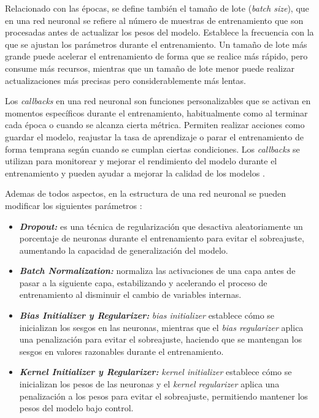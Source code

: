 Relacionado con las épocas, se define también el tamaño de lote (\textit{batch size}), que en una red neuronal se refiere al número de muestras de entrenamiento que son procesadas antes de actualizar los pesos del modelo. Establece la frecuencia con la que se ajustan los parámetros durante el entrenamiento. Un tamaño de lote más grande puede acelerar el entrenamiento de forma que se realice más rápido, pero consume más recursos, mientras que un tamaño de lote menor puede realizar actualizaciones más precisas pero considerablemente más lentas.

Los \textit{callbacks} en una red neuronal son funciones personalizables que se activan en momentos específicos durante el entrenamiento, habitualmente como al terminar cada época o cuando se alcanza cierta métrica. Permiten realizar acciones como guardar el modelo, reajustar la tasa de aprendizaje o parar el entrenamiento de forma temprana según cuando se cumplan ciertas condiciones. Los \textit{callbacks} se utilizan para monitorear y mejorar el rendimiento del modelo durante el entrenamiento y pueden ayudar a mejorar la calidad de los modelos \cite{callbacks}.

Ademas de todos aspectos, en la estructura de una red neuronal se pueden modificar los siguientes parámetros \cite{parametros-arquitectura}:
\begin{itemize}
    \item \textbf{\textit{Dropout:}}
es una técnica de regularización que desactiva aleatoriamente un porcentaje de neuronas durante el entrenamiento para evitar el sobreajuste, aumentando la capacidad de generalización del modelo.

\item \textbf{\textit{Batch Normalization:}}
normaliza las activaciones de una capa antes de pasar a la siguiente capa, estabilizando y acelerando el proceso de entrenamiento al disminuir el cambio de variables internas.

\item \textbf{\textit{Bias Initializer y Regularizer:}}
\textit{bias initializer} establece cómo se inicializan los sesgos en las neuronas, mientras que el \textit{bias regularizer} aplica una penalización para evitar el sobreajuste, haciendo que se mantengan los sesgos en valores razonables durante el entrenamiento.

\item \textbf{\textit{Kernel Initializer y Regularizer:}}
\textit{kernel initializer} establece cómo se inicializan los pesos de las neuronas y el \textit{kernel regularizer} aplica una penalización a los pesos para evitar el sobreajuste, permitiendo mantener los pesos del modelo bajo control.
\end{itemize}

